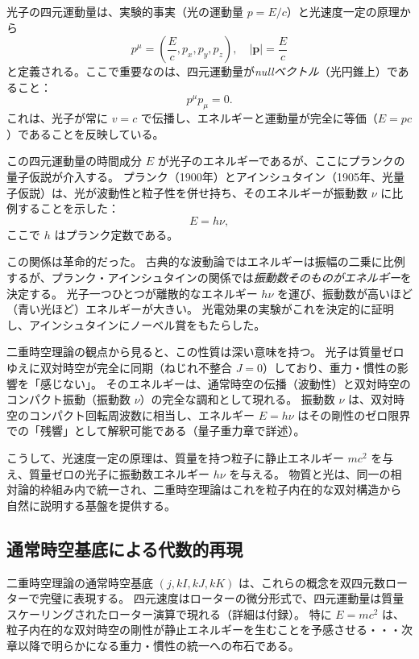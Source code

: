 \documentclass[dvipdfmx,a4paper]{jsbook}
\theoremstyle{definition}
\theoremstyle{remark}
\begin{document}
光子の四元運動量は、実験的事実（光の運動量 $p = E/c$）と光速度一定の原理から
\begin{equation}
  p^\mu = \left( \frac{E}{c}, p_x, p_y, p_z \right), \quad |\mathbf{p}| = \frac{E}{c}
  \label{eq:photon-four-momentum}
\end{equation}
と定義される。ここで重要なのは、四元運動量が\emph{nullベクトル}（光円錐上）であること：
\begin{equation}
  p^\mu p_\mu = 0.
\end{equation}
これは、光子が常に $v = c$ で伝播し、エネルギーと運動量が完全に等価（$E = p c$）であることを反映している。

この四元運動量の時間成分 $E$ が光子のエネルギーであるが、ここにプランクの量子仮説が介入する。  
プランク（1900年）とアインシュタイン（1905年、光量子仮説）は、光が波動性と粒子性を併せ持ち、そのエネルギーが振動数 $\nu$ に比例することを示した：
\begin{equation}
  E = h \nu,
  \label{eq:planck-einstein}
\end{equation}
ここで $h$ はプランク定数である。

この関係は革命的だった。  
古典的な波動論ではエネルギーは振幅の二乗に比例するが、プランク・アインシュタインの関係では\emph{振動数そのものがエネルギー}を決定する。  
光子一つひとつが離散的なエネルギー $h\nu$ を運び、振動数が高いほど（青い光ほど）エネルギーが大きい。  
光電効果の実験がこれを決定的に証明し、アインシュタインにノーベル賞をもたらした。

二重時空理論の観点から見ると、この性質は深い意味を持つ。  
光子は質量ゼロゆえに双対時空が完全に同期（ねじれ不整合 $J = 0$）しており、重力・慣性の影響を「感じない」。  
そのエネルギーは、通常時空の伝播（波動性）と双対時空のコンパクト振動（振動数 $\nu$）の完全な調和として現れる。  
振動数 $\nu$ は、双対時空のコンパクト回転周波数に相当し、エネルギー $E = h \nu$ はその剛性のゼロ限界での「残響」として解釈可能である（量子重力章で詳述）。  

こうして、光速度一定の原理は、質量を持つ粒子に静止エネルギー $m c^2$ を与え、質量ゼロの光子に振動数エネルギー $h \nu$ を与える。  
物質と光は、同一の相対論的枠組み内で統一され、二重時空理論はこれを粒子内在的な双対構造から自然に説明する基盤を提供する。

\subsection{通常時空基底による代数的再現}

二重時空理論の通常時空基底 $(j, kI, kJ, kK)$ は、これらの概念を双四元数ローターで完璧に表現する。  
四元速度はローターの微分形式で、四元運動量は質量スケーリングされたローター演算で現れる（詳細は付録）。  
特に $E = m c^2$ は、粒子内在的な双対時空の剛性が静止エネルギーを生むことを予感させる・・・次章以降で明らかになる重力・慣性の統一への布石である。
\end{document}
